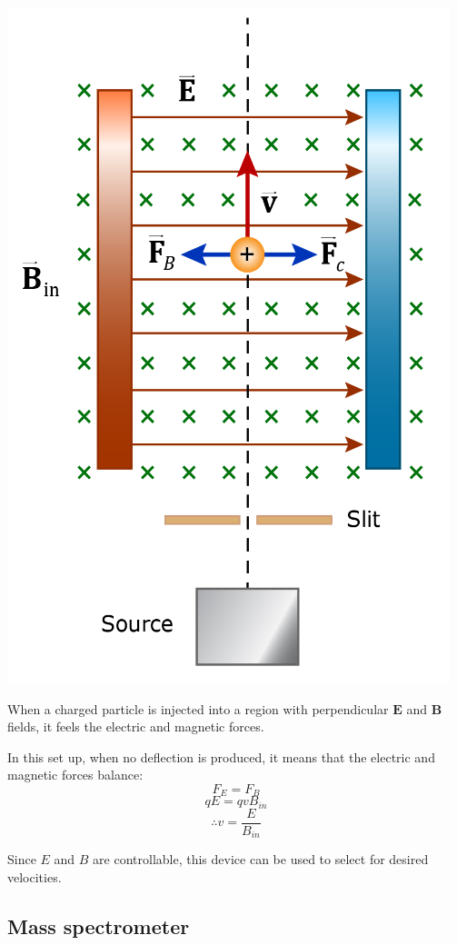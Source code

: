 \documentclass[11pt]{article}
\begin{document}
\begin{center}
\includegraphics[scale=0.7]{./images/velocity-selector.png}
\end{center}

When a charged particle is injected into a region with perpendicular \(\boldsymbol{E}\) and \(\boldsymbol{B}\) fields, it feels the electric and magnetic forces.


In this set up, when no deflection is produced, it means that the electric and magnetic forces balance:
\[F_E = F_B\]
\[qE = qv B_{in}\]
\[\therefore v = \frac{E}{B_{in}}\]

Since \(E\) and \(B\) are controllable, this device can be used to select for desired velocities.
\subsection{Mass spectrometer}
\label{sec:orgdff64b8}
\end{document}
